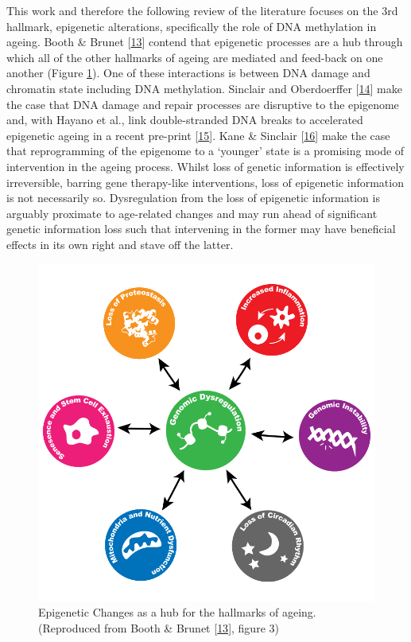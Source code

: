 \documentclass[
]{book}
\begin{document}
This work and therefore the following review of the literature focuses on the 3rd hallmark, epigenetic alterations, specifically the role of DNA methylation in ageing.
Booth \& Brunet {[}\protect\hyperlink{ref-Booth2016}{13}{]} contend that epigenetic processes are a hub through which all of the other hallmarks of ageing are mediated and feed-back on one another (Figure \ref{fig:Booth2016fig3}).
One of these interactions is between DNA damage and chromatin state including DNA methylation.
Sinclair and Oberdoerffer {[}\protect\hyperlink{ref-Sinclair2009}{14}{]} make the case that DNA damage and repair processes are disruptive to the epigenome and, with Hayano et al., link double-stranded DNA breaks to accelerated epigenetic ageing in a recent pre-print {[}\protect\hyperlink{ref-Hayano2019}{15}{]}.
Kane \& Sinclair {[}\protect\hyperlink{ref-Kane2019}{16}{]} make the case that reprogramming of the epigenome to a `younger' state is a promising mode of intervention in the ageing process.
Whilst loss of genetic information is effectively irreversible, barring gene therapy-like interventions, loss of epigenetic information is not necessarily so.
Dysregulation from the loss of epigenetic information is arguably proximate to age-related changes and may run ahead of significant genetic information loss such that intervening in the former may have beneficial effects in its own right and stave off the latter.

\begin{figure}

{\centering \includegraphics[width=0.6\linewidth]{figs/Booth2016_F3_epigenomeHubAgingHallmarks_alpha} 

}

\caption{Epigenetic Changes as a hub for the hallmarks of ageing. (Reproduced from Booth \& Brunet {[}\protect\hyperlink{ref-Booth2016}{13}{]}, figure 3)}\label{fig:Booth2016fig3}
\end{figure}
\end{document}
